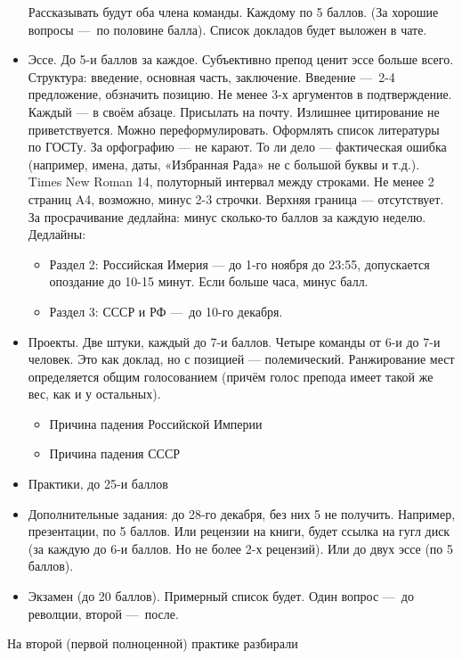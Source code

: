 \documentclass[12pt, a4paper]{article}
\begin{document}
\begin{itemize}
        Рассказывать будут оба члена команды. Каждому по 5 баллов. (За хорошие вопросы — по половине балла). 
        Список докладов будет выложен в чате.
        \item Эссе. До 5-и баллов за каждое. Субъективно препод ценит эссе больше всего. Структура: введение, основная часть, заключение.
        Введение — 2-4 предложение, обзначить позицию.
        Не менее 3-х аргументов в подтверждение. Каждый — в своём абзаце. Присылать на почту. 
        Излишнее цитирование не приветствуется. Можно переформулировать.
        Оформлять список литературы по ГОСТу.
        За орфографию — не карают. То ли дело — фактическая ошибка (например, имена, даты, «Избранная Рада» не с большой буквы и т.д.).
        Times New Roman 14, полуторный интервал между строками. Не менее 2 страниц A4, возможно, минус 2-3 строчки. Верхняя граница — отсутствует. 
        За просрачивание дедлайна: минус сколько-то баллов за каждую неделю. Дедлайны:
        \begin{itemize}
            \item Раздел 2: Российская Имерия — до 1-го ноября до 23:55, допускается опоздание до 10-15 минут. Если больше часа, минус балл.
            \item Раздел 3: СССР и РФ — до 10-го декабря.
        \end{itemize}
        \item Проекты. Две штуки, каждый до 7-и баллов.
        Четыре команды от 6-и до 7-и человек.
        Это как доклад, но с позицией — полемический.
        Ранжирование мест определяется общим голосованием (причём голос препода имеет такой же вес, как и у остальных).
        \begin{itemize}
            \item Причина падения Российской Империи
            \item Причина падения СССР
        \end{itemize}
        \item Практики, до 25-и баллов
        \item Дополнительные задания: до 28-го декабря, без них 5 не получить. Например, презентации, по 5 баллов. 
        Или рецензии на книги, будет ссылка на гугл диск (за каждую до 6-и баллов. Но не более 2-х рецензий).
        Или до двух эссе (по 5 баллов).
        \item Экзамен (до 20 баллов). Примерный список будет. Один вопрос — до револции, второй — после.
    \end{itemize}

    На второй (первой полноценной) практике разбирали
\end{document}
